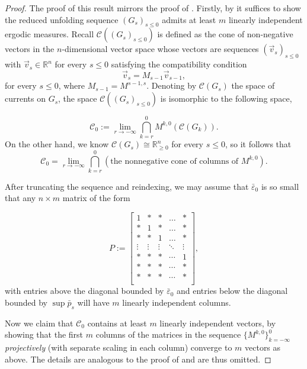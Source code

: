 \documentclass[11pt, letterpaper]{amsart}
\theoremstyle{plain}
\theoremstyle{definition}
\newcommand{\R}{\mathbb{R}}
\newcommand{\calC}{\mathcal{C}}
\renewcommand{\epsilon}{\varepsilon}
\newcommand{\eps}{\epsilon}
\begin{document}
\begin{proof}
    The proof of this result mirrors the proof of .
    Firstly, by  it suffices to show the reduced unfolding sequence $(G_s)_{s \le 0}$ admits at least $m$ linearly independent ergodic measures. Recall $\calC((G_s)_{s\le 0})$ is defined as the cone of non-negative vectors in the $n$-dimensional vector space whose vectors are sequences $(\vec{v}_s)_{s \le 0}$ with $\vec{v}_s \in \R^n$ for every $s \le 0$ satisfying the compatibility condition
    \[
        \vec{v}_s = M_{s-1}\vec{v}_{s-1},
    \]
    for every $s \le 0$, where $M_{s-1}=M^{s-1,s}$. Denoting by $\calC(G_s)$ the space of currents on $G_s$,
    the space $\mathcal{C}((G_s)_{s \le 0})$ is isomorphic to the following
    space,
    
    \[
        \mathcal{C}_0 := \lim_{r \to -\infty} \bigcap_{k=r}^0 M^{k,0}(\calC(G_k)).
    \]
    On the other hand, we know  $\calC(G_s) \cong \R^n_{\ge 0}$ for every $s \le 0$, so it follows that
    \[
        \mathcal{C}_0 = \lim_{r \to -\infty} \bigcap_{k = r}^0 \left(\text{the nonnegative cone of columns of $M^{k,0}$}\right).
        \]

   After truncating the sequence and reindexing, we may assume that $\bar\eps_0$ is
   so small that any $n\times m$ matrix of the form

    
    \[
    P:=
    \begin{bmatrix}
        1 & * & * & \ldots & * \\
        * & 1 & * & \ldots & * \\
        * & * & 1 & \ldots & * \\
        \vdots & \vdots & \vdots & \ddots & \vdots \\
        * & * & * & \cdots & 1 \\
        * & * & * & \cdots & * \\
        * & * & * & \cdots & * \\
    \end{bmatrix},
    \] 
    with entries above the diagonal bounded by $\bar\eps_0$ and
    entries below the diagonal bounded by $\sup\bar p_s$ will have $m$ linearly independent columns.

    Now we claim that $\mathcal{C}_0$ contains at least $m$ linearly independent
    vectors, by showing that the first $m$ columns of the matrices in the
    sequence $\{M^{k,0}\}_{k=-\infty}^{0}$ \emph{projectively} (with
    separate scaling in each column) converge to $m$
    vectors as above. The details are analogous to the proof of
     and are thus omitted.
\end{proof}
\end{document}
